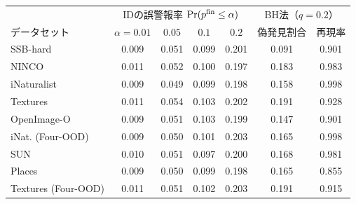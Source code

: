 {\fontsize{6.5pt}{7.6pt}\selectfont\renewcommand{\arraystretch}{1.0}%
\setlength{\tabcolsep}{1.7pt}\begin{tabular}{@{}lcccc|cc@{}}
\hline
\rule[-2.0pt]{0pt}{8.6pt} & \multicolumn{4}{c|}{IDの誤警報率 $\Pr(p^{\mathrm{fin}}\le\alpha)$} & \multicolumn{2}{c}{BH法（$q{=}0.2$）} \\
\rule[-2.0pt]{0pt}{8.6pt}データセット & $\alpha{=}0.01$ & $0.05$ & $0.1$ & $0.2$ & 偽発見割合 & 再現率 \\
\hline
SSB-hard & 0.009 & 0.051 & 0.099 & 0.201 & 0.091 & 0.901 \\
NINCO & 0.011 & 0.052 & 0.100 & 0.197 & 0.183 & 0.983 \\
iNaturalist & 0.009 & 0.049 & 0.099 & 0.198 & 0.158 & 0.998 \\
Textures & 0.011 & 0.054 & 0.103 & 0.202 & 0.191 & 0.928 \\
OpenImage-O & 0.009 & 0.051 & 0.103 & 0.199 & 0.147 & 0.901 \\
iNat. (Four-OOD) & 0.009 & 0.050 & 0.101 & 0.203 & 0.165 & 0.998 \\
SUN & 0.010 & 0.051 & 0.097 & 0.200 & 0.168 & 0.981 \\
Places & 0.009 & 0.050 & 0.099 & 0.198 & 0.165 & 0.855 \\
Textures (Four-OOD) & 0.011 & 0.051 & 0.102 & 0.203 & 0.191 & 0.915 \\
\hline
\end{tabular}}%
